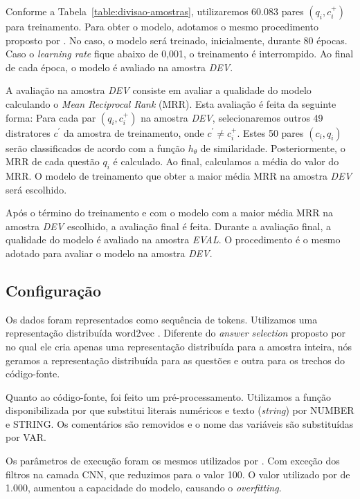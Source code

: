 \documentclass[12pt]{article}
\begin{document}
Conforme a Tabela~\ref{table:divisao-amostras}, utilizaremos 60.083 pares $(q_{i}, c_{i}^{+})$ para treinamento. Para obter o modelo, adotamos o mesmo procedimento proposto por \cite{iyer-etal-2016-summarizing}. No caso, o modelo será treinado, inicialmente, durante 80 épocas. Caso o \textit{learning rate} fique abaixo de 0,001, o treinamento é interrompido. Ao final de cada época, o modelo é avaliado na amostra \emph{DEV}. 


A avaliação na amostra \emph{DEV} consiste em avaliar a qualidade do modelo calculando o \textit{Mean Reciprocal Rank} (MRR). Esta avaliação é feita da seguinte forma:
 Para cada par $(q_{i}, c_{i}^{+})$ na amostra \emph{DEV}, selecionaremos outros 49 distratores $c^{'}$ da amostra de treinamento, onde $c^{'} \neq c_{i}^{+}$. Estes 50 pares $(c_{i}, q_{i})$ serão classificados de acordo com a função $h_{\theta}$ de similaridade. Posteriormente, o MRR de cada questão $q_{i}$ é calculado. Ao final, calculamos a média do valor do MRR. O modelo de treinamento que obter a maior média MRR na amostra \emph{DEV} será escolhido. 
 
 
 
 Após o término do treinamento e com o modelo com a maior média MRR na amostra \emph{DEV} escolhido, a avaliação final é feita. Durante a avaliação final, a qualidade do modelo é avaliado na amostra \emph{EVAL}. O procedimento é o mesmo adotado para avaliar o modelo na amostra \emph{DEV}.


\subsection{Configuração}

Os dados foram representados como sequência de tokens. Utilizamos uma representação distribuída word2vec \cite{mikolov-word2vec-2013}. Diferente do \textit{answer selection} proposto por \cite{tan-lstm-qa} no qual ele cria apenas uma representação distribuída para a amostra inteira, nós geramos a representação distribuída para as questões e outra para os trechos do código-fonte.

Quanto ao código-fonte, foi feito um pré-processamento. Utilizamos a função disponibilizada por \cite{Yao-staqc:2018} que substitui literais numéricos e texto (\textit{string}) por NUMBER e STRING. Os comentários são removidos e o nome das variáveis são substituídas por VAR.

Os parâmetros de execução foram os mesmos utilizados por \cite{tan-lstm-qa}. Com exceção dos filtros na camada CNN, que reduzimos para o valor 100. O valor utilizado por \cite{tan-lstm-qa} de 1.000, aumentou a capacidade do modelo, causando o \textit{overfitting}.
\end{document}
